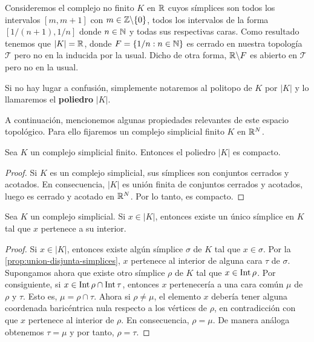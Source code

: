 \begin{ejemplo}
	Consideremos el complejo no finito $K$ en $\mathbb{R}$ cuyos símplices son todos los intervalos
	$[m,m+1]$ con $m \in \mathbb{Z} \backslash \{0\}$, todos los intervalos de la forma
	$[1/( n+1), 1/n]$ donde $n \in \mathbb{N}$ y todas sus respectivas caras. Como resultado
	tenemos que $|K| = \mathbb{R}$, donde $F = \{1/n : n \in \mathbb{N}\}$ es cerrado en nuestra
	topología $\mathcal{T}$ pero no en la inducida por la usual. Dicho de otra forma,
	$\mathbb{R} \backslash F$ es abierto en $\mathcal{T}$ pero no en la usual.
\end{ejemplo}

Si no hay lugar a confusión, simplemente notaremos al politopo de $K$ por $|K|$
y lo llamaremos el \textbf{poliedro} $|K|$.

A continuación, mencionemos algunas propiedades relevantes de este espacio
topológico. Para ello fijaremos un complejo simplicial finito $K$ en $\mathbb{R}^{N}$.

\begin{proposicion}
	Sea $K$ un complejo simplicial finito. Entonces el poliedro $|K|$ es compacto.
\end{proposicion}
\begin{proof}
	Si $K$ es un complejo simplicial, sus símplices son conjuntos cerrados y
	acotados. En consecuencia, $|K|$ es unión finita de conjuntos cerrados y
	acotados, luego es cerrado y acotado en $\mathbb{R}^{N}$. Por lo tanto, es compacto.
\end{proof}

\begin{proposicion}
	Sea $K$ un complejo simplicial. \label{prop:simpl-soporte} Si $x \in |K|$, entonces
	existe un único símplice en $K$ tal que $x$ pertenece a su interior.
\end{proposicion}
\begin{proof}
	Si $x \in |K|$, entonces existe algún símplice $\sigma$ de $K$ tal que
	$x \in \sigma$. Por la \autoref{prop:union-disjunta-simplices}, $x$ pertenece
	al interior de alguna cara $\tau$ de $\sigma$. Supongamos ahora que existe otro
	símplice $\rho$ de $K$ tal que $x \in \operatorname{Int} \rho$. Por consiguiente, si $x
	\in \operatorname{Int} \rho \cap \operatorname{Int} \tau$, entonces $x$ pertenecería a una cara
	común $\mu$ de $\rho$ y $\tau$. Esto es, $\mu = \rho \cap \tau$. Ahora si $\rho
	\neq \mu$, el elemento $x$ debería tener alguna coordenada baricéntrica nula
	respecto a los vértices de $\rho$, en contradicción con que $x$ pertenece al interior
	de $\rho$. En consecuencia, $\rho = \mu$. De manera análoga obtenemos
	$\tau = \mu$ y por tanto, $\rho = \tau$.
\end{proof}


